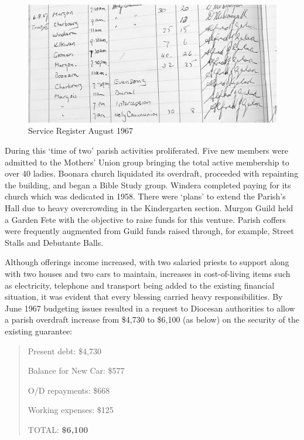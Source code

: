 \begin{figure}[!htb]
\begin{center}
\includegraphics[width=1.\textwidth,center]{../images/serviceRegisterAug1967.jpg}
\caption{Service Register August 1967}
\end{center}
\end{figure}




During this `time of two' parish activities proliferated. Five new members were admitted to the Mothers' Union group bringing the total active membership to over 40 ladies. Boonara church liquidated its overdraft, proceeded with repainting the building, and began a Bible Study group. Windera completed paying for its church which was dedicated in 1958. There were `plans' to extend the Parish's Hall due to heavy overcrowding in the Kindergarten section. Murgon Guild held a Garden Fete with the objective to raise funds for this venture. Parish coffers were frequently augmented from Guild funds raised through, for example, Street Stalls and Debutante Balls.



Although offerings income increased, with two salaried priests to support along with two houses and two cars to maintain, increases in cost-of-living items such as electricity, telephone and transport being added to the existing financial situation, it was evident that every blessing carried heavy responsibilities. By June 1967 budgeting issues resulted in a request to Diocesan authorities to allow a parish overdraft increase from \$4,730 to \$6,100 (as below) on the security of the existing guarantee:



\begin{quote}

Present debt: \$4,730



Balance for New Car: \$577



O/D repayments: \$668



Working expenses: \$125



TOTAL: \textbf{\$6,100}

\end{quote}



